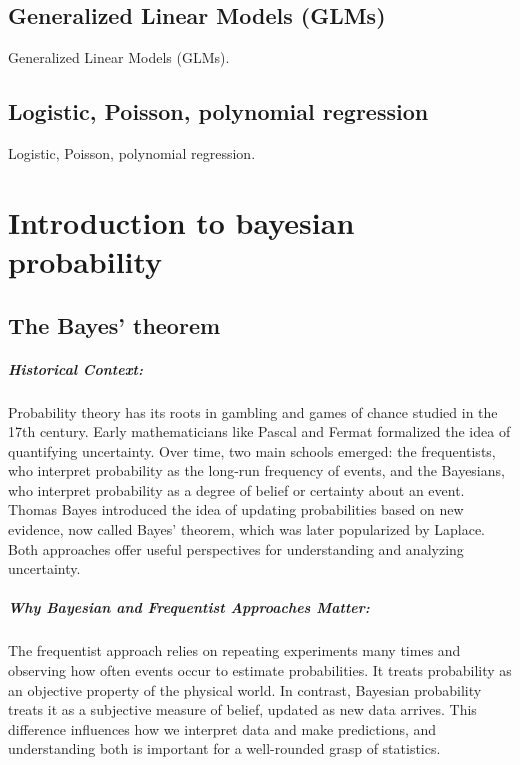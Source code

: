 \documentclass{book}
\begin{document}
\newpage

\section{Generalized Linear Models (GLMs)}
Generalized Linear Models (GLMs).

\newpage

\section{Logistic, Poisson, polynomial regression}
Logistic, Poisson, polynomial regression.



\chapter{Introduction to bayesian probability}

\section{The Bayes' theorem}

\paragraph{Historical Context:}
Probability theory has its roots in gambling and games of chance studied in the 17th century. Early mathematicians like Pascal and Fermat formalized the idea of quantifying uncertainty. Over time, two main schools emerged: the frequentists, who interpret probability as the long-run frequency of events, and the Bayesians, who interpret probability as a degree of belief or certainty about an event. Thomas Bayes introduced the idea of updating probabilities based on new evidence, now called Bayes’ theorem, which was later popularized by Laplace. Both approaches offer useful perspectives for understanding and analyzing uncertainty.

\paragraph{Why Bayesian and Frequentist Approaches Matter:}
The frequentist approach relies on repeating experiments many times and observing how often events occur to estimate probabilities. It treats probability as an objective property of the physical world. In contrast, Bayesian probability treats it as a subjective measure of belief, updated as new data arrives. This difference influences how we interpret data and make predictions, and understanding both is important for a well-rounded grasp of statistics.
\end{document}
